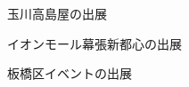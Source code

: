 \begin{figure}[htbp]
    \begin{center}
    \end{center}
    \caption{玉川高島屋の出展}
    \label{fig:takashimaya}
\end{figure}

\begin{figure}[htbp]
    \begin{center}
    \end{center}
    \caption{イオンモール幕張新都心の出展}
    \label{fig:aeon}
\end{figure}

\begin{figure}[htbp]
    \begin{center}
    \end{center}
    \caption{板橋区イベントの出展}
    \label{fig:itabashi}
\end{figure}

